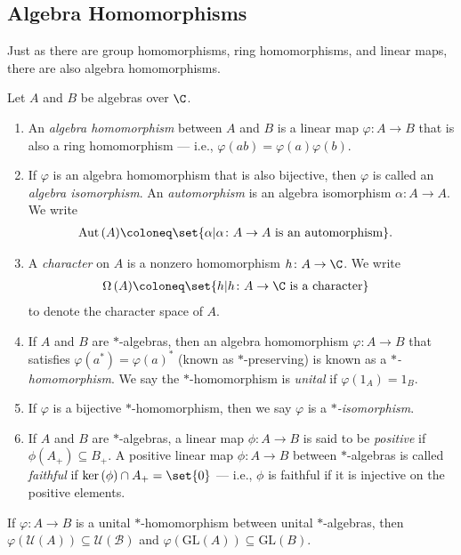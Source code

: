 \subsection{Algebra Homomorphisms}%
Just as there are group homomorphisms, ring homomorphisms, and linear maps, there are also algebra homomorphisms.
\begin{definition}
  Let $A$ and $B$ be algebras over $\C$.
  \begin{enumerate}[(1)]
    \item An \textit{algebra homomorphism} between $A$ and $B$ is a linear map $\varphi\colon A\rightarrow B$ that is also a ring homomorphism --- i.e., $\varphi\left(ab\right) = \varphi\left(a\right)\varphi\left(b\right)$.
    \item If $\varphi$ is an algebra homomorphism that is also bijective, then $\varphi$ is called an \textit{algebra isomorphism}. An \textit{automorphism} is an algebra isomorphism $\alpha\colon A\rightarrow A$. We write
      \begin{align*}
        \operatorname{Aut}\left(A\right) &\coloneq \set{\alpha | \alpha\colon A\rightarrow A\text{ is an automorphism}}.
      \end{align*}
    \item A \textit{character} on $A$ is a nonzero homomorphism $h\colon A\rightarrow \C$. We write
      \begin{align*}
        \Omega\left(A\right) &\coloneq \set{h | h\colon A\rightarrow \C\text{ is a character}}
      \end{align*}
      to denote the character space of $A$.
    \item If $A$ and $B$ are $\ast$-algebras, then an algebra homomorphism $\varphi\colon A\rightarrow B$ that satisfies $\varphi\left(a^{\ast}\right) = \varphi\left(a\right)^{\ast}$ (known as $\ast$-preserving) is known as a \textit{$\ast$-homomorphism}. We say the $\ast$-homomorphism is \textit{unital} if $\varphi\left( 1_A \right) = 1_B$.
    \item If $\varphi$ is a bijective $\ast$-homomorphism, then we say $\varphi$ is a \textit{$\ast$-isomorphism}.
    \item If $A$ and $B$ are $\ast$-algebras, a linear map $\phi\colon A\rightarrow B$ is said to be \textit{positive} if $\phi\left(A_{+}\right)\subseteq B_{+}$. A positive linear map $\phi\colon A\rightarrow B$ between $\ast$-algebras is called \textit{faithful} if $\ker\left(\phi\right)\cap A_{+} = \set{0}$ --- i.e., $\phi$ is faithful if it is injective on the positive elements.
  \end{enumerate}
\end{definition}
\begin{fact}\label{fact:unitary_preservation}
  If $\varphi\colon A\rightarrow B$ is a unital $\ast$-homomorphism between unital $\ast$-algebras, then $\varphi\left( \mathcal{U}\left( A \right) \right)\subseteq \mathcal{U}\left( \mathcal{B} \right)$ and $\varphi\left( \text{GL}\left( A \right) \right)\subseteq \text{GL}\left( B \right) $.
\end{fact}


